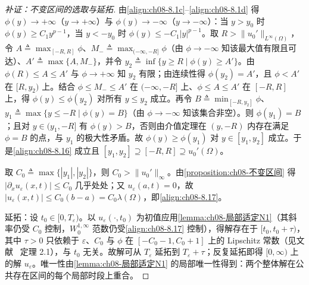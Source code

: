 \documentclass[../../main.tex]{subfiles}%
\begin{document}
\begin{proof}[补证：不变区间的选取与延拓]
由\eqref{align:ch08-8.1c}--\eqref{align:ch08-8.1d} 得 $\phi(y)\to+\infty$（$y\to+\infty$）与 $\phi(y)\to-\infty$（$y\to-\infty$）：当 $y>y_0$ 时 $\phi(y)\geqslant C_1y^{p-1}$，当 $y<-y_0$ 时 $\phi(y)\leqslant-C_1|y|^{p-1}$。取 $R>\|u_0'\|_{L^\infty(\Omega)}$，令 $A\triangleq\max_{[-R,R]}\phi$、$M_-\triangleq\max_{(-\infty,-R]}\phi$（由 $\phi\to-\infty$ 知该最大值有限且可达）、$A'\triangleq\max\{A,M_-\}$，并令 $y_2\triangleq\inf\{y\geqslant R\mid\phi(y)\geqslant A'\}$。由 $\phi(R)\leqslant A\leqslant A'$ 与 $\phi\to+\infty$ 知 $y_2$ 有限；由连续性得 $\phi(y_2)=A'$，且 $\phi<A'$ 在 $[R,y_2)$ 上。结合 $\phi\leqslant M_-\leqslant A'$ 在 $(-\infty,-R]$ 上、$\phi\leqslant A\leqslant A'$ 在 $[-R,R]$ 上，得 $\phi(y)\leqslant\phi(y_2)$ 对所有 $y\leqslant y_2$ 成立。再令 $B\triangleq\min_{[-R,y_2]}\phi$、$y_1\triangleq\max\{y\leqslant-R\mid\phi(y)=B\}$（由 $\phi\to-\infty$ 知该集合非空）。则 $\phi(y_1)=B$；且对 $y\in(y_1,-R]$ 有 $\phi(y)>B$，否则由介值定理在 $(y,-R)$ 内存在满足 $\phi=B$ 的点，与 $y_1$ 的极大性矛盾。故 $\phi(y)\geqslant\phi(y_1)$ 对 $y\in[y_1,y_2]$ 成立。于是\eqref{align:ch08-8.16} 成立且 $[y_1,y_2]\supseteq[-R,R]\supseteq u_0'(\Omega)$。

取 $C_0\triangleq\max\{|y_1|,|y_2|\}$，则 $C_0>\|u_0'\|_\infty$。由\cref{proposition:ch08-不变区间} 得 $|\partial_xu_\varepsilon(x,t)|\leqslant C_0$ 几乎处处；又 $u_\varepsilon(a,t)=0$，故 $|u_\varepsilon(x,t)|\leqslant C_0(b-a)=C_0\lambda(\Omega)$，即\eqref{align:ch08-8.17}。

延拓：设 $t_0\in[0,T_\varepsilon)$。以 $u_\varepsilon(\cdot,t_0)$ 为初值应用\cref{lemma:ch08-局部适定N1}（其斜率仍受 $C_0$ 控制，$W^{1,\infty}_0$ 范数仍受\eqref{align:ch08-8.17} 控制），得解存在于 $[t_0,t_0+\tau)$，其中 $\tau>0$ 只依赖于 $\varepsilon$、$C_0$ 与 $\phi$ 在 $[-C_0-1,C_0+1]$ 上的 Lipschitz 常数（见文献~\cite{ref74} 定理 2.1），与 $t_0$ 无关。故解可从 $T_\varepsilon$ 延拓到 $T_\varepsilon+\tau$；反复延拓即得 $[0,\infty)$ 上的解 $u_\varepsilon$。唯一性由\cref{lemma:ch08-局部适定N1} 的局部唯一性得到：两个整体解在公共存在区间的每个局部时段上重合。
\end{proof}
\end{document}

